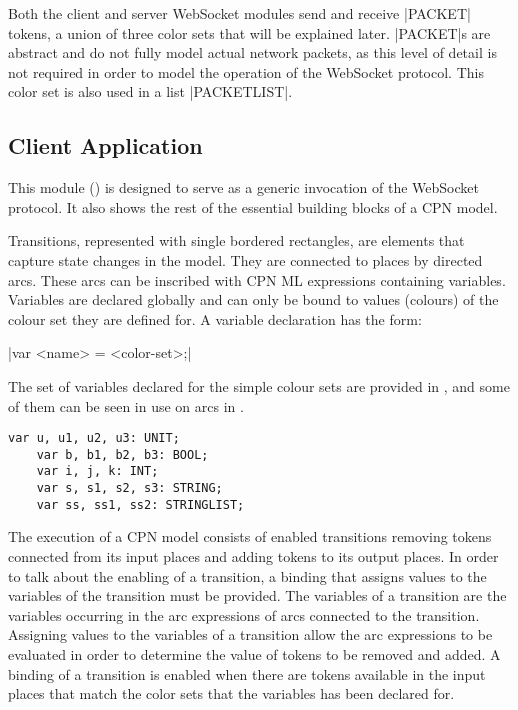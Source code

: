 	Both the client and server WebSocket modules send and receive
	|PACKET| tokens, a union of three color sets that will be explained later.
	|PACKET|s are abstract and do not fully model actual network packets, as this
	level of detail is not required in order to model the operation of the
	WebSocket protocol.
	This color set is also used in a list |PACKETLIST|.
	

\subsection{Client Application}

	
	This module () is designed to serve as a generic invocation
	of the WebSocket protocol. It also shows the rest of the essential building blocks
	of a CPN model.
	
	Transitions, represented with single bordered rectangles, are elements that
	capture state changes in the model. They are connected to places by
	directed arcs. These arcs can be inscribed with CPN ML expressions containing
	variables. Variables are declared globally and can only be bound to values
	(colours) of the colour set they are defined for. A variable declaration has
	the form:
	
	|var <name> = <color-set>;|
	
	The set of variables declared for the simple colour sets are provided in
	, and some of them can be seen in use on arcs in
	. 
	
	\begin{lstlisting}[label=lst:standard_vars,caption=Simple Colourset
	Variables,gobble=1,float=h] 
	var u, u1, u2, u3: UNIT;
	var b, b1, b2, b3: BOOL;
	var i, j, k: INT;
	var s, s1, s2, s3: STRING;
	var ss, ss1, ss2: STRINGLIST;
	\end{lstlisting}
	
	The execution of a CPN model consists of enabled transitions removing tokens
	connected from its input places and adding tokens to its output places. In
	order to talk about the enabling of a transition, a binding that assigns
	values to the variables of the transition must be provided. The variables of a
	transition are the variables occurring in the arc expressions of arcs
	connected to the transition. Assigning values to the variables of a transition
	allow the arc expressions to be evaluated in order to determine the value of
	tokens to be removed and added. A binding of a transition is enabled when
	there are tokens available in the input places that match the color sets that
	the variables has been declared for. 

